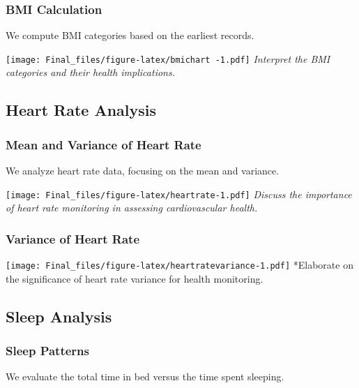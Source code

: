 \documentclass[
]{article}
\begin{document}
\hypertarget{bmi-calculation}{%
\subsubsection{BMI Calculation}\label{bmi-calculation}}

We compute BMI categories based on the earliest records.

\texttt{[image: Final\_files/figure-latex/bmichart -1.pdf]}
\emph{Interpret the BMI categories and their health implications.}

\hypertarget{heart-rate-analysis}{%
\subsection{Heart Rate Analysis}\label{heart-rate-analysis}}

\hypertarget{mean-and-variance-of-heart-rate}{%
\subsubsection{Mean and Variance of Heart
Rate}\label{mean-and-variance-of-heart-rate}}

We analyze heart rate data, focusing on the mean and variance.

\texttt{[image: Final\_files/figure-latex/heartrate-1.pdf]} \emph{Discuss
the importance of heart rate monitoring in assessing cardiovascular
health.}

\hypertarget{variance-of-heart-rate}{%
\subsubsection{Variance of Heart Rate}\label{variance-of-heart-rate}}

\texttt{[image: Final\_files/figure-latex/heartratevariance-1.pdf]}
*Elaborate on the significance of heart rate variance for health
monitoring.

\hypertarget{sleep-analysis}{%
\subsection{Sleep Analysis}\label{sleep-analysis}}

\hypertarget{sleep-patterns}{%
\subsubsection{Sleep Patterns}\label{sleep-patterns}}

We evaluate the total time in bed versus the time spent sleeping.
\end{document}
